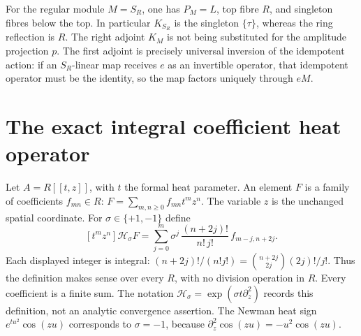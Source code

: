 \documentclass[11pt]{article}
\newcommand{\Ht}{\mathcal H}
\begin{document}
For the regular module $M=S_R$, one has $P_M=L$, top fibre $R$,
and singleton fibres below the top. In particular $K_{S_R}$
is the singleton $\{\tau\}$, whereas the ring reflection is $R$.
The right adjoint $K_M$ is not being substituted for the amplitude
projection $p$. The first adjoint is precisely universal inversion
of the idempotent action: if an $S_R$-linear map receives $e$ as
an invertible operator, that idempotent operator must be the
identity, so the map factors uniquely through $eM$.

\section{The exact integral coefficient heat operator}

Let $A=R[[t,z]]$, with $t$ the formal heat parameter. An element
$F$ is a family of coefficients $f_{mn}\in R$:
$F=\sum_{m,n\ge0}f_{mn}t^mz^n$. The variable $z$ is the
unchanged spatial coordinate. For $\sigma\in\{+1,-1\}$ define
\begin{equation}\tag{SH15}\label{sh:heat}
 [t^mz^n]\Ht_\sigma F
 =\sum_{j=0}^m
       \sigma^j\,\frac{(n+2j)!}{n!\,j!}\,f_{m-j,n+2j}.
\end{equation}
Each displayed integer is integral:
$(n+2j)!/(n!j!)=\binom{n+2j}{2j}(2j)!/j!$.
Thus the definition makes sense over every $R$, with no division
operation in $R$. Every coefficient is a finite sum. The notation
$\Ht_\sigma=\exp(\sigma t\partial_z^2)$ records this definition,
not an analytic convergence assertion. The Newman heat sign
$e^{tu^2}\cos(zu)$ corresponds to $\sigma=-1$, because
$\partial_z^2\cos(zu)=-u^2\cos(zu)$.
\end{document}
